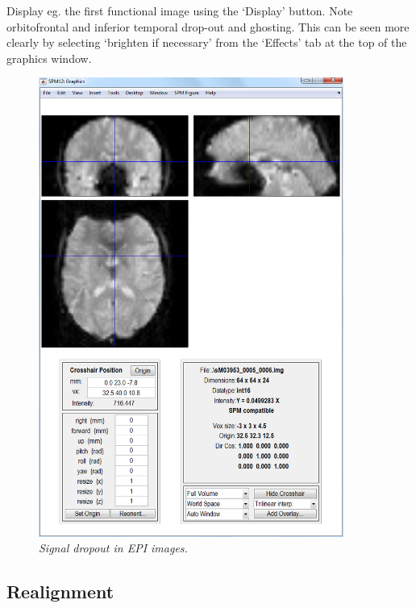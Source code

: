 \documentclass[a4paper,titlepage]{book}
\begin{document}
Display eg. the first functional image using the 
`Display' button. Note orbitofrontal 
  and inferior temporal drop-out and ghosting. This 
  can be seen more clearly by selecting `brighten if necessary' from the `Effects' tab at the top of the 
  graphics window.
  \begin{figure}
\begin{center}
\includegraphics[width=100mm]{dropout}
\caption{\em Signal dropout in EPI images. \label{dropout}}
\end{center}
\end{figure}

\subsection{Realignment}
\end{document}
